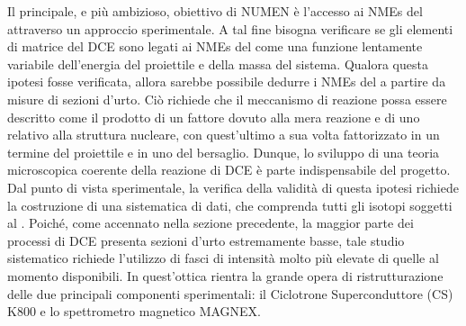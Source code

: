 Il principale, e più ambizioso, obiettivo di NUMEN è l'accesso ai NMEs del \doppiobeta{} attraverso un approccio sperimentale. A tal fine bisogna verificare se gli elementi di matrice del DCE sono legati ai NMEs del \doppiobeta{} come una funzione lentamente variabile dell'energia del proiettile e della massa del sistema.
Qualora questa ipotesi fosse verificata, allora sarebbe possibile dedurre i NMEs del \doppiobeta{} a partire da misure di sezioni d'urto.
Ciò richiede che il meccanismo di reazione possa essere descritto come il prodotto di un fattore dovuto alla mera reazione e di uno relativo alla struttura nucleare, con quest'ultimo a sua volta fattorizzato in un termine del proiettile e in uno del bersaglio.
Dunque, lo sviluppo di una teoria microscopica coerente della reazione di DCE è parte indispensabile del progetto. 
Dal punto di vista sperimentale, la verifica della validità di questa ipotesi richiede la costruzione di una sistematica di dati, che comprenda tutti gli isotopi soggetti al \doppiobeta.
Poiché, come accennato nella sezione precedente, la maggior parte dei processi di DCE presenta sezioni d'urto estremamente basse, tale studio sistematico richiede l'utilizzo di fasci di intensità molto più elevate di quelle al momento disponibili.
In quest'ottica rientra la grande opera di ristrutturazione delle due principali componenti sperimentali: il Ciclotrone Superconduttore (CS) K800 e lo spettrometro magnetico MAGNEX.

